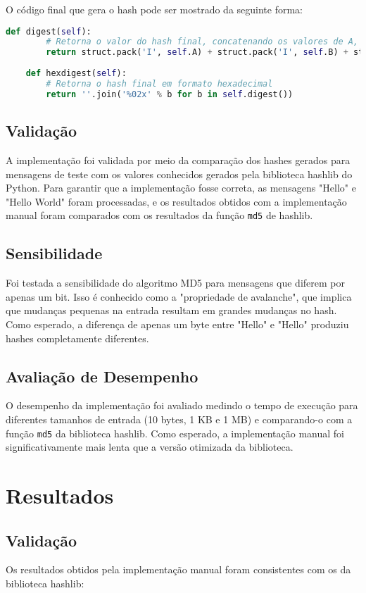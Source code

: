 \documentclass{article}
\begin{document}
O código final que gera o hash pode ser mostrado da seguinte forma:

\begin{lstlisting}[language=Python]
    def digest(self):
        # Retorna o valor do hash final, concatenando os valores de A, B, C e D
        return struct.pack('I', self.A) + struct.pack('I', self.B) + struct.pack('I', self.C) + struct.pack('I', self.D)
    
    def hexdigest(self):
        # Retorna o hash final em formato hexadecimal
        return ''.join('%02x' % b for b in self.digest())
\end{lstlisting}

\subsection{Validação}
A implementação foi validada por meio da comparação dos hashes gerados para mensagens de teste com os valores conhecidos gerados pela biblioteca hashlib do Python. Para garantir que a implementação fosse correta, as mensagens "Hello" e "Hello World" foram processadas, e os resultados obtidos com a implementação manual foram comparados com os resultados da função \texttt{md5} de hashlib.

\subsection{Sensibilidade}
Foi testada a sensibilidade do algoritmo MD5 para mensagens que diferem por apenas um bit. Isso é conhecido como a "propriedade de avalanche", que implica que mudanças pequenas na entrada resultam em grandes mudanças no hash. Como esperado, a diferença de apenas um byte entre "Hello" e "Hello" produziu hashes completamente diferentes.

\subsection{Avaliação de Desempenho}
O desempenho da implementação foi avaliado medindo o tempo de execução para diferentes tamanhos de entrada (10 bytes, 1 KB e 1 MB) e comparando-o com a função \texttt{md5} da biblioteca hashlib. Como esperado, a implementação manual foi significativamente mais lenta que a versão otimizada da biblioteca.

\section{Resultados}
\subsection{Validação}
Os resultados obtidos pela implementação manual foram consistentes com os da biblioteca hashlib:
\end{document}

